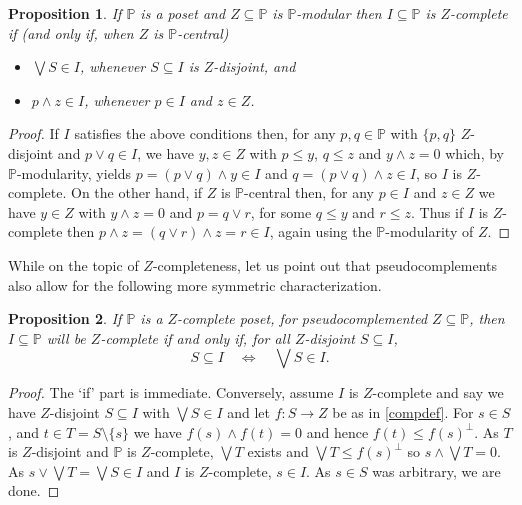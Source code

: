 \documentclass{amsart}
\newtheorem{prp}[prp]{Proposition}
\theoremstyle{definition}
\numberwithin{equation}{section}
\begin{document}
\begin{prp}\label{pwedgez}
If $\mathbb{P}$ is a poset and $Z\subseteq\mathbb{P}$ is $\mathbb{P}$-modular then $I\subseteq\mathbb{P}$ is $Z$-complete if (and only if, when $Z$ is $\mathbb{P}$-central)
\begin{itemize}
\item[\eqref{compdef1}] $\bigvee S\in I$, whenever $S\subseteq I$ is $Z$-disjoint, and
\item[\eqref{compdef2}$'$] $p\wedge z\in I$, whenever $p\in I$ and $z\in Z$.
\end{itemize}
\end{prp}

\begin{proof}
If $I$ satisfies the above conditions then, for any $p,q\in\mathbb{P}$ with $\{p,q\}$ $Z$-disjoint and $p\vee q\in I$, we have $y,z\in Z$ with $p\leq y$, $q\leq z$ and $y\wedge z=0$ which, by $\mathbb{P}$-modularity, yields $p=(p\vee q)\wedge y\in I$ and $q=(p\vee q)\wedge z\in I$, so $I$ is $Z$-complete.  On the other hand, if $Z$ is $\mathbb{P}$-central then, for any $p\in I$ and $z\in Z$ we have $y\in Z$ with $y\wedge z=0$ and $p=q\vee r$, for some $q\leq y$ and $r\leq z$.  Thus if $I$ is $Z$-complete then $p\wedge z=(q\vee r)\wedge z=r\in I$, again using the $\mathbb{P}$-modularity of $Z$.
\end{proof}


While on the topic of $Z$-completeness, let us point out that pseudocomplements also allow for the following more symmetric characterization.

\begin{prp}
If $\mathbb{P}$ is a $Z$-complete poset, for pseudocomplemented $Z\subseteq\mathbb{P}$, then $I\subseteq\mathbb{P}$ will be $Z$-complete if and only if, for all $Z$-disjoint $S\subseteq I$, \[S\subseteq I\quad\Leftrightarrow\quad\bigvee S\in I.\]
\end{prp}

\begin{proof}
The `if' part is immediate.  Conversely, assume $I$ is $Z$-complete and say we have $Z$-disjoint $S\subseteq I$ with $\bigvee S\in I$ and let $f:S\rightarrow Z$ be as in \autoref{compdef}.  For $s\in S$, and $t\in T=S\setminus\{s\}$ we have $f(s)\wedge f(t)=0$ and hence $f(t)\leq f(s)^\perp$.  As $T$ is $Z$-disjoint and $\mathbb{P}$ is $Z$-complete, $\bigvee T$ exists and $\bigvee T\leq f(s)^\perp$ so $s\wedge\bigvee T=0$.  As $s\vee\bigvee T=\bigvee S\in I$ and $I$ is $Z$-complete, $s\in I$.  As $s\in S$ was arbitrary, we are done.
\end{proof}
\end{document}

